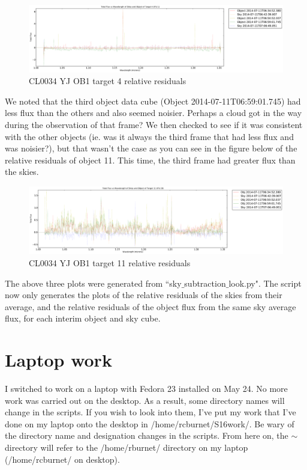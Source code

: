 \documentclass[10pt,letterpaper]{article}
\begin{document}
\begin{figure}[h!]
\caption{CL0034 YJ OB1 target 4 relative residuals}\label{fig:CL0034 YJ OB1 target 4 relative residuals}
\includegraphics[scale=0.4]{figures/sky_flux_raw.pdf}
\end{figure}

We noted that the third object data cube (Object 2014-07-11T06:59:01.745) had less flux than the others and also seemed noisier. Perhaps a cloud got in the way during the observation of that frame? We then checked to see if it was consistent with the other objects (ie. was it always the third frame that had less flux and was noisier?), but that wasn't the case as you can see in the figure below of the relative residuals of object 11. This time, the third frame had greater flux than the skies.\\

\begin{figure}[h!]
\caption{CL0034 YJ OB1 target 11 relative residuals}\label{fig:CL0034 YJ OB1 target 11 relative residuals}
\includegraphics[scale=0.4]{figures/sky_flux.pdf}
\end{figure}

The above three plots were generated from ``sky$\_$subtraction$\_$look.py". The script now only generates the plots of the relative residuals of the skies from their average, and the relative residuals of the object flux from the same sky average flux, for each interim object and sky cube.\\

\section{Laptop work}
I switched to work on a laptop with Fedora 23 installed on May 24. No more work was carried out on the desktop. As a result, some directory names will change in the scripts. If you wish to look into them, I've put my work that I've done on my laptop onto the desktop in /home/rcburnet/S16work/. Be wary of the directory name and designation changes in the scripts. From here on, the $\sim$ directory will refer to the /home/rburnet/ directory on my laptop (/home/rcburnet/ on desktop).
\end{document}
